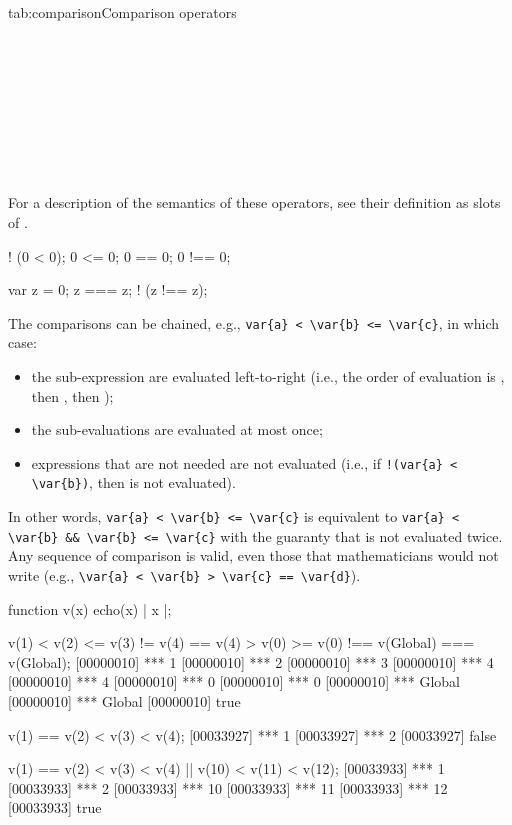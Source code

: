\begin{operatorTable}{tab:comparison}{Comparison operators}
  \operatoreq\\
  \operatorneq\\
  \operatorpeq\\
  \operatorpneq\\
  \operatoraeq\\
  \operatoreqaeq\\
  \operatorinf\\
  \operatorinfeq\\
  \operatorsup\\
  \operatorsupeq
\end{operatorTable}

For a description of the semantics of these operators, see their definition
as slots of .

\begin{urbiassert}
 ! (0 <  0);
    0 <= 0;
    0 == 0;
   0 !== 0;

var z = 0;
     z === z;
  ! (z !== z);
\end{urbiassert}

The comparisons can be chained, e.g.,
\lstinline|var{a} < \var{b} <= \var{c}|, in which case:
\begin{itemize}
\item the sub-expression are evaluated left-to-right (i.e., the order of
  evaluation is , then , then );
\item the sub-evaluations are evaluated at most once;
\item expressions that are not needed are not evaluated (i.e., if
  \lstinline|!(var{a} < \var{b})|, then  is not evaluated).
\end{itemize}

In other words, \lstinline|var{a} < \var{b} <= \var{c}| is equivalent to
\lstinline|var{a} < \var{b} && \var{b} <= \var{c}| with the guaranty that
 is not evaluated twice.  Any sequence of comparison is valid, even
those that mathematicians would not write (e.g.,
\lstinline|\var{a} < \var{b} > \var{c} == \var{d}|).

\begin{urbiscript}
function v(x) { echo(x) | x }|;

v(1) < v(2) <= v(3) != v(4) == v(4) > v(0) >= v(0) !== v(Global) === v(Global);
[00000010] *** 1
[00000010] *** 2
[00000010] *** 3
[00000010] *** 4
[00000010] *** 4
[00000010] *** 0
[00000010] *** 0
[00000010] *** Global
[00000010] *** Global
[00000010] true

v(1) == v(2) < v(3) < v(4);
[00033927] *** 1
[00033927] *** 2
[00033927] false

v(1) == v(2) < v(3) < v(4) || v(10) < v(11) < v(12);
[00033933] *** 1
[00033933] *** 2
[00033933] *** 10
[00033933] *** 11
[00033933] *** 12
[00033933] true
\end{urbiscript}

